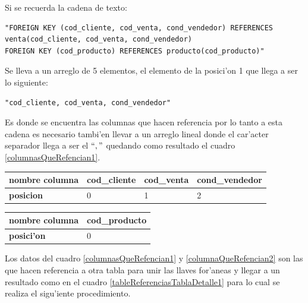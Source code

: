 Si se recuerda la cadena de texto: 
\lstset{language=sql,breaklines=true}
\begin{lstlisting}
"FOREIGN KEY (cod_cliente, cod_venta, cond_vendedor) REFERENCES venta(cod_cliente, cod_venta, cond_vendedor)
FOREIGN KEY (cod_producto) REFERENCES producto(cod_producto)"
\end{lstlisting}
Se lleva a un arreglo de 5 elementos, el elemento de la posici'on 1 que llega a ser lo siguiente:
\lstset{language=sql,breaklines=true}
\begin{lstlisting}
"cod_cliente, cod_venta, cond_vendedor"
\end{lstlisting}
Es donde se encuentra las columnas que hacen referencia por lo tanto a esta cadena es necesario tambi'en llevar a un arreglo lineal donde el car'acter separador llega a ser el $`` , " $  quedando como resultado  el cuadro \ref{columnasQueRefencian1}.
\begin{center}
\scriptsize
\renewcommand{\arrayrulewidth}{1pt}
  \label{columnasQueRefencian1} %
  \begin{tabular}{|l|l|l|l|}
\hline
\textbf{nombre columna} & cod\_cliente & cod\_venta & cond\_vendedor \\ \hline
\textbf{posicion}       & 0            & 1          & 2              \\ \hline
\end{tabular}
\end{center}


\begin{center}
\scriptsize
\renewcommand{\arrayrulewidth}{1pt}
  \label{columnaQueRefencian2} %
  \begin{tabular}{|l|l|}
\hline
\textbf{nombre columna} & cod\_producto \\ \hline
\textbf{posici'on}      & 0             \\ \hline
\end{tabular}
\end{center}

Los datos del cuadro \ref{columnasQueRefencian1} y \ref{columnaQueRefencian2} son las que hacen referencia a otra tabla para unir las llaves for'aneas y llegar a un resultado como en el cuadro \ref{tableReferenciasTablaDetalle1} para lo cual se realiza el sigu'iente procedimiento.

